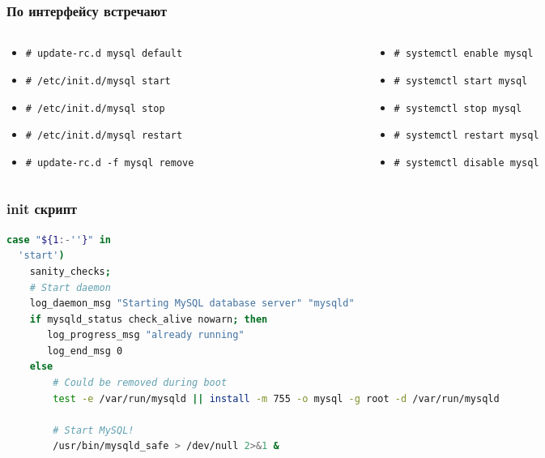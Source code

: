 \documentclass[aspectratio=169]{beamer}
\begin{document}
\begin{frame}
  \frametitle{По интерфейсу встречают}

  \begin{columns}
    \begin{column}{.5\textwidth}
      \begin{itemize}
        \item {\tt \# update-rc.d mysql default}
        \item {\tt \# /etc/init.d/mysql start}
        \item {\tt \# /etc/init.d/mysql stop}
        \item {\tt \# /etc/init.d/mysql restart}
        \item {\tt \# update-rc.d -f mysql remove}
      \end{itemize}
    \end{column}

    \begin{column}{.5\textwidth}
      \begin{itemize}
        \item {\tt \# systemctl enable mysql}
        \item {\tt \# systemctl start mysql}
        \item {\tt \# systemctl stop mysql}
        \item {\tt \# systemctl restart mysql}
        \item {\tt \# systemctl disable mysql}
      \end{itemize}
    \end{column}
  \end{columns}

\end{frame}


\begin{frame}[fragile]
  \frametitle{init скрипт}

  \begin{lstlisting}[language=sh,caption=одна двенадцатая файла /etc/init.d/mysql в Debian 5]
case "${1:-''}" in
  'start')
	sanity_checks;
	# Start daemon
	log_daemon_msg "Starting MySQL database server" "mysqld"
	if mysqld_status check_alive nowarn; then
	   log_progress_msg "already running"
	   log_end_msg 0
	else
	    # Could be removed during boot
	    test -e /var/run/mysqld || install -m 755 -o mysql -g root -d /var/run/mysqld

 	    # Start MySQL! 
  	    /usr/bin/mysqld_safe > /dev/null 2>&1 &

  \end{lstlisting}

\end{frame}
\end{document}
